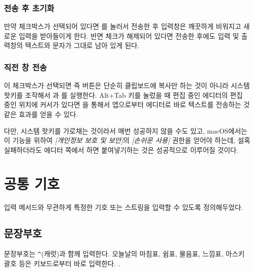 \documentclass{simplman}
\newcommand*\guielem[1]{\colorbox{blue8!20}{\sffamily[#1]}}
\begin{document}
\subsection{전송 후 초기화}

만약 \guielem{전송 후 초기화} 체크박스가 선택되어 있다면 
를 눌러서 전송한 후 입력창은 깨끗하게 비워지고 새로운 입력을 받아들이게 한다.
반면 체크가 해제되어 있다면 전송한 후에도 입력 및 출력창의 텍스트와 문자가 그대로 남아 있게 된다.

\subsection{직전 창 전송}

이 체크박스가 선택되면  즉 \guielem{클립보드로 전송} 버튼은 
단순히 클립보드에 복사만 하는 것이 아니라 시스템 핫키를 조작해서 과
를 실행한다. Alt+Tab 키를 눌렀을 때 편집 중인 에디터의
편집 중인 위치에 커서가 있다면 \guielem{직전 창 전송}을 통해서 앱으로부터 에디터로
바로 텍스트를 전송하는 것 같은 효과를 얻을 수 있다.

다만, 시스템 핫키를 가로채는 것이라서 매번 성공하지 않을 수도 있고, \mbox{macOS}에서는
이 기능을 위하여 \textit{[개인정보 보호 및 보안]}의 \textit{[손쉬운 사용]} 권한을 얻어야
하는데, 설혹 실패하더라도 에디터 쪽에서 하면 붙여넣기하는 것은
성공적으로 이루어질 것이다.

\chapter{공통 기호}

입력 메서드와 무관하게 특정한 기호 또는 스트링을 입력할 수 있도록 정의해두었다.

\section{문장부호}

문장부호는 \verb|^|(캐럿)과 함께 입력한다. 오늘날의 마침표, 쉼표, 물음표, 느낌표, 아스키 괄호 등은 키보드로부터 바로 입력한다. .
\end{document}
